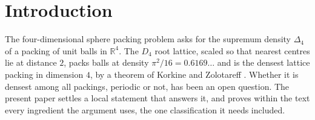 \documentclass[11pt,reqno]{amsart}
\renewcommand{\_}{\origunderscore\allowbreak}
\numberwithin{equation}{section}
\theoremstyle{plain}
\theoremstyle{definition}
\theoremstyle{remark}
\begin{document}
\maketitle

\tableofcontents

\section{Introduction}\label{sec:intro}

The four-dimensional sphere packing problem asks for the supremum
density $\Delta_4$ of a packing of unit balls in $\mathbb{R}^4$. The
$D_4$ root lattice, scaled so that nearest centres lie at distance $2$,
packs balls at density $\pi^2/16=0.6169\ldots$ and is the densest
lattice packing in dimension $4$, by a theorem of Korkine and Zolotareff
\cite{KZ1872}. Whether it is densest among all packings, periodic or
not, has been an open question. The present paper settles a local statement
that answers it, and proves within the text every ingredient the
argument uses, the one classification it needs included.
\end{document}
